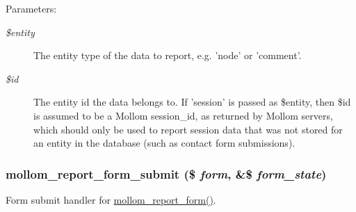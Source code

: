 \begin{Desc}
\item[Parameters:]
\begin{description}
\item[{\em \$entity}]The entity type of the data to report, e.g. 'node' or 'comment'. \item[{\em \$id}]The entity id the data belongs to. If 'session' is passed as \$entity, then \$id is assumed to be a Mollom session\_\-id, as returned by Mollom servers, which should only be used to report session data that was not stored for an entity in the database (such as contact form submissions). \end{description}
\end{Desc}
\hypertarget{mollom_8pages_8inc_6b60683fcd61a267fa8f7861194f6484}{
\subsubsection[{mollom\_\-report\_\-form\_\-submit}]{\setlength{\rightskip}{0pt plus 5cm}mollom\_\-report\_\-form\_\-submit (\$ {\em form}, \/  \&\$ {\em form\_\-state})}}
\label{mollom_8pages_8inc_6b60683fcd61a267fa8f7861194f6484}


Form submit handler for \hyperlink{mollom_8pages_8inc_0aa683f81a3e5993abd967762344272a}{mollom\_\-report\_\-form()}. 